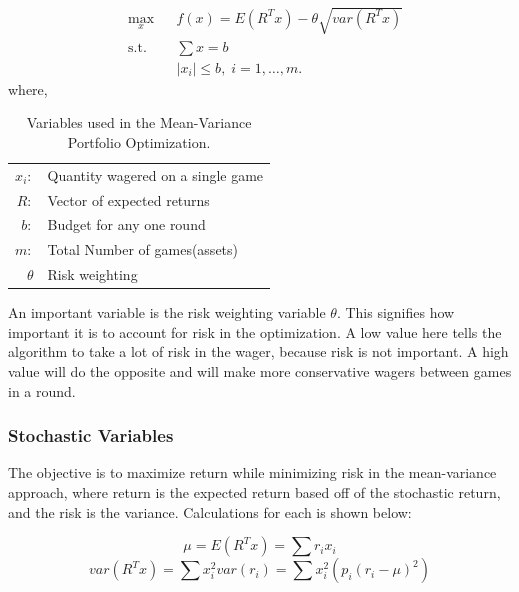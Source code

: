 \documentclass[12pt]{article}
\begin{document}
\begin{equation}
\begin{aligned}
& \underset{x}{\text{max}}
& & f(x) =  E(R^Tx)-\theta\sqrt{var(R^Tx)}\\
& \text{s.t.}
& & \sum{x}=b\\
&&& |x_i| \leq b, \; i = 1, \ldots, m.
\end{aligned}
\label{portOpt}
\end{equation}
where,

\begin{table}[htbp!]
\begin{centering}
    \begin{tabular}{r l}
    $x_i:$      & Quantity wagered on a single game \\ 
    $R:$        & Vector of expected returns        \\ 
    $b:$        & Budget for any one round       	\\ 
    $m:$        & Total Number of games(assets)    	\\ 
    $\theta$	& Risk weighting					\\
    \end{tabular}
    \label{mop_vars}
    \caption{Variables used in the Mean-Variance Portfolio Optimization.}
\end{centering}
\end{table}
An important variable is the risk weighting variable $\theta$.
This signifies how important it is to account for risk in the optimization.
A low value here tells the algorithm to take a lot of risk in the wager, because risk is not important.
A high value will do the opposite and will make more conservative wagers between games in a round.

\subsubsection*{Stochastic Variables}
The objective is to maximize return while minimizing risk in the mean-variance approach, where return is the expected return based off of the stochastic return, and the risk is the variance.
Calculations for each is shown below:

\begin{equation}
\mu = E(R^Tx)=\sum r_i x_i
\end{equation}
\begin{equation}
var(R^Tx)=\sum x_i^2var(r_i)=\sum x_i^2(p_i(r_i-\mu)^2)
\end{equation}
\end{document}
